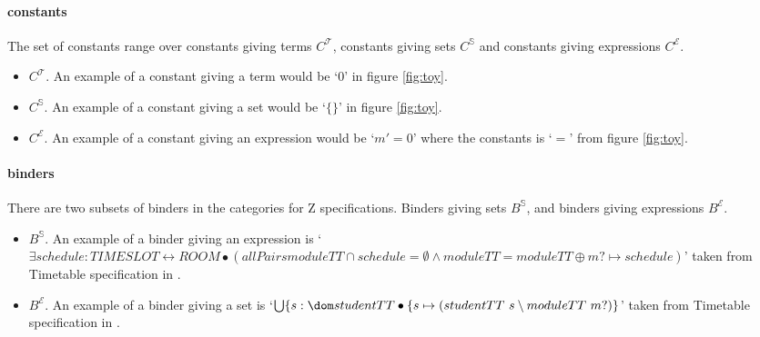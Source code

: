 \paragraph{constants}
\label{subsubsec:costants}

The set of constants range over constants giving terms $C^{\mathcal{T}}$,
constants giving sets $C^{\mathbb{S}}$ and constants giving expressions
$C^{\mathcal{E}}$.

\begin{itemize} 
\item $C^{\mathcal{T}}$. An example of a constant giving a term would be `$0$'
in figure \ref{fig:toy}.

\item $C^{\mathbb{S}}$. An example of a constant giving a set would be `$\{\}$'
in figure \ref{fig:toy}.

\item $C^{\mathcal{E}}$. An example of a constant giving an expression would be
`$m' = 0$' where the constants is `$=$' from figure \ref{fig:toy}.
\end{itemize}

\paragraph{binders}
\label{subsubsec:binders}

There are two subsets of binders in the categories for Z specifications. Binders
giving sets $B^{\mathbb{S}}$, and binders giving expressions $B^{\mathcal{E}}$.

\begin{itemize}
\item $B^{\mathbb{S}}$. An example of a binder giving an expression is 
\newline
\noindent `$\exists schedule:TIMESLOT \leftrightarrow ROOM \bullet (allPairs
moduleTT \cap schedule = \emptyset \land moduleTT = moduleTT \oplus {m? \mapsto
schedule})$'
\newline
\noindent taken from Timetable specification in \cite{mathlangexamples}.

\item $B^{\mathcal{E}}$. An example of a binder giving a set is
\newline
\noindent `$\bigcup \{s:\dom studentTT \bullet \{s \mapsto (studentTT~s
\setminus moduleTT~m?)\}$' \newline
\noindent taken from Timetable specification in \cite{mathlangexamples}.
\end{itemize}

